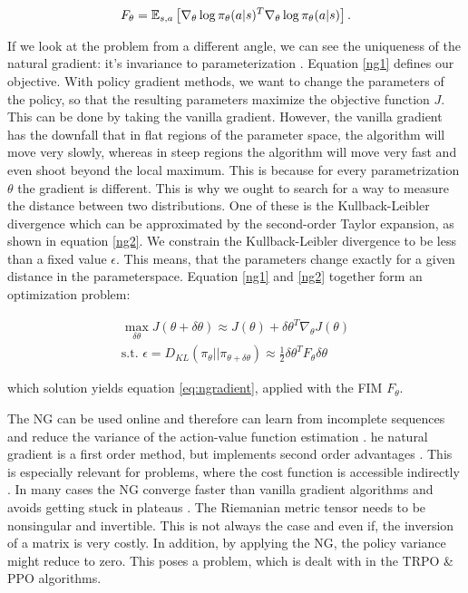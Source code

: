 \begin{equation}
	F_\theta=\operatorname{\mathbb{E}}_{s,a}\left[\nabla_{\theta}\log\pi_{\theta}(a|s)^{T}\nabla_{\theta}\log\pi_{\theta}(a|s)\right].
\end{equation}

If we look at the problem from a different angle, we can see the uniqueness of the natural gradient: it's invariance to parameterization \cite{pascanu2013revisiting, peters2008natural}. Equation \ref{ng1} defines our objective. With policy gradient methods, we want to change the parameters of the policy, so that the resulting parameters maximize the objective function $J$. This can be done by taking the vanilla gradient. However, the vanilla gradient has the downfall that in flat regions of the parameter space, the algorithm will move very slowly, whereas in steep regions the algorithm will move very fast and even shoot beyond the local maximum. This is because for every parametrization $\theta$ the gradient is different. This is why we ought to search for a way to measure the distance between two distributions. One of these is the Kullback-Leibler divergence which can be approximated by the second-order Taylor expansion, as shown in equation \ref{ng2}. We constrain the Kullback-Leibler divergence to be less than a fixed value $\epsilon$. This means, that the parameters change exactly for a given distance in the parameterspace. Equation \ref{ng1} and \ref{ng2} together form an optimization problem:

\begin{align}
	\max_{\delta\theta} J(\theta + \delta\theta) \approx J(\theta) + \delta\theta^T\nabla_\theta J(\theta)\label{ng1}\\
	\text{s.t. } \epsilon = D_{KL}(\pi_{\theta} || \pi_{\theta + \delta\theta}) \approx \tfrac{1}{2} \delta\theta^T F_\theta \delta\theta\label{ng2}
\end{align}

which solution yields equation \ref{eq:ngradient}, applied with the FIM $F_\theta$.

\begin{itemize}
	\x {} The NG can be used online and therefore can learn from incomplete sequences and reduce the variance of the action-value function estimation \cite{pascanu2013revisiting, peters2008natural}.
	\x {} he natural gradient is a first order method, but implements second order advantages \cite{pascanu2013revisiting}. This is especially relevant for problems, where the cost function is accessible indirectly \cite{desjardins2013metric}.
	\x {} In many cases the NG converge faster than vanilla gradient algorithms \cite{sohl2012natural, amari1998natural} and avoids getting stuck in plateaus \cite{amari1998efficiently, amari1998natural}.
	\x {} The Riemanian metric tensor needs to be nonsingular and invertible. This is not always the case and even if, the inversion of a matrix is very costly. In addition, by applying the NG, the policy variance might reduce to zero. This poses a problem, which is dealt with in the TRPO \& PPO algorithms.
\end{itemize}

